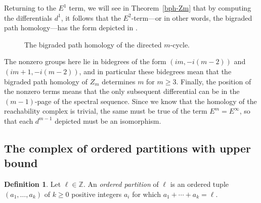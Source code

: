 \documentclass[a4paper, 11 pt, oneside, reqno]{amsart}
\numberwithin{lemma}{section}
\theoremstyle{definition}
\newtheorem{definition}[lemma]{Definition}
\newcommand{\mathbbZ}{\mathbb{Z}}
\begin{document}
Returning to the $E^1$ term,
we will see in Theorem~\ref{bph-Zm} that by computing the
differentials $d^1$,
it follows that the $E^2$-term---or in other words, the bigraded path homology---has the form depicted in .
\begin{figure}[h!]
    \centering
    \caption{The bigraded path homology of the directed \(m\)-cycle.}
    \label{fig:E2_Zm}
\end{figure}
The nonzero groups here lie in bidegrees of the form
$(im,-i(m-2))$ and $(im+1,-i(m-2))$, and in particular these
bidegrees mean that the bigraded path homology of $Z_m$
determines $m$ for $m\geq 3$.
Finally, the position of the nonzero terms means that the only
subsequent differential can be in the $(m-1)$-page of the 
spectral sequence.
Since we know that the homology of the reachability complex is trivial, the same 
must be true of the term $E^m=E^\infty$, so that each $d^{m-1}$
depicted must be an isomorphism.




\subsection{The complex of ordered partitions with upper bound}

\begin{definition}
    Let $\ell\in\mathbbZ$.
    An \emph{ordered partition} of $\ell$
    is an ordered tuple $(a_1,\ldots,a_k)$
    of $k\geq 0$ positive integers $a_i$ for which
    $a_1+\cdots+a_k=\ell$.
\end{definition}
\end{document}
